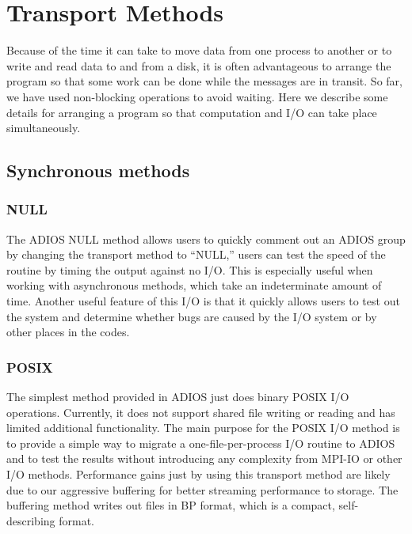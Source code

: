 \chapter{Transport Methods}
\label{chapter-methods}
\label{chapter-methods}

Because of the time it can take to move data from one process to another or to 
write and read data to and from a disk, it is often advantageous to arrange the 
program so that some work can be done while the messages are in transit. So far, 
we have used non-blocking operations to avoid waiting. Here we describe some details 
for arranging a program so that computation and I/O can take place simultaneously.\label{HToc84890256}\label{HToc212016632}\label{HToc212016874}\label{HToc182553380}

\section{Synchronous methods}

\subsection{NULL}

The ADIOS NULL method allows users to quickly comment out an ADIOS group by changing 
the transport method to ``NULL,'' users can test the speed of the routine by timing 
the output against no I/O. This is especially useful when working with asynchronous 
methods, which take an indeterminate amount of time.  Another useful feature of 
this I/O is that it quickly allows users to test out the system and determine whether 
bugs are caused by the I/O system or by other places in the codes.\label{HToc84890258}\label{HToc212016634}\label{HToc212016876}\label{HToc182553382}

\subsection{POSIX}

The simplest method provided in ADIOS just does binary POSIX I/O operations. Currently, 
it does not support shared file writing or reading and has limited additional functionality. 
The main purpose for the POSIX I/O method is to provide a simple way to migrate 
a one-file-per-process I/O routine to ADIOS and to test the results without introducing 
any complexity from MPI-IO or other I/O methods. Performance gains just by using 
this transport method are likely due to our aggressive buffering for better streaming 
performance to storage. The buffering method writes out files in BP format, which 
is a compact, self-describing format. 

